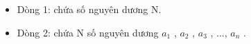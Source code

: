 \begin{itemize}
	\item     Dòng 1: chứa số nguyên dương N.   
	\item     Dòng 2: chứa N số nguyên dương $a_{1}$    , $a_{2}$    , $a_{3}$    , ..., $a_{n}$    .   
\end{itemize}